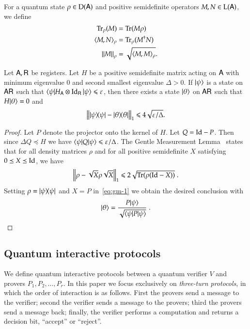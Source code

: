 For a quantum state $\rho \in \mathrm{D}({\mathsf{A}})$ and positive semidefinite operators $M,N \in \mathrm{L}({\mathsf{A}})$, we define 
\begin{align}
	\operatorname{Tr}_\rho(M) &= \operatorname{Tr}(M \rho) \\
	\langle M, N \rangle_\rho &= \operatorname{Tr}_\rho (M^\dagger N) \\
	\left\lVert M \right\rVert_\rho & = \sqrt{ \langle M, M \rangle_\rho}.
\end{align}

\begin{lemma}
\label{lem:closeness_to_groundspace}
	Let ${\mathsf{A}}, {\mathsf{R}}$ be registers. Let $H$ be a positive semidefinite matrix acting on ${\mathsf{A}}$ with minimum eigenvalue $0$ and second smallest eigenvalue $\Delta > 0$. If $|\psi\rangle$ is a state on ${\mathsf{A}} {\mathsf{R}}$ such that $\langle\psi| H_{{\mathsf{A}}} \otimes \mathop{\mathrm{Id}}\!\mathinner{}_{{\mathsf{R}}} |\psi\rangle \leqslant \varepsilon$, then there exists a state $|\theta\rangle$ on ${\mathsf{A}} {\mathsf{R}}$ such that $H |\theta\rangle = 0$ and
	\[
		\left \| |\psi\rangle\! \langle \psi| - |\theta\rangle\! \langle \theta| \right \|_1 \leqslant 4\sqrt{\varepsilon/\Delta}.
	\]
\end{lemma}
\begin{proof}
	Let $P$ denote the projector onto the kernel of $H$. Let $Q = \mathop{\mathrm{Id}}\!\mathinner{} - P$. Then since $\Delta Q \preceq H$ we have $\langle\psi| Q |\psi\rangle \leqslant \varepsilon/\Delta$. The Gentle Measurement Lemma~\cite{ogawa2002new} states that for all density matrices $\rho$ and for all positive semidefinite $X$ satisfying $0 \preceq X \preceq \mathop{\mathrm{Id}}\!\mathinner{}$, we have
	\begin{equation}\label{eq:gm-1}
		\left \| \rho - \sqrt{X}\rho \sqrt{X}  \right \|_1 \leq 2 \sqrt{ \Tr(\rho (\Id - X))}\;.
	\end{equation}
	Setting $\rho = |\psi\rangle\! \langle \psi|$ and $X = P$ in~\eqref{eq:gm-1} we obtain the desired conclusion with
	\[
		|\theta\rangle = \frac{ P |\psi\rangle}{\sqrt{ \langle\psi| P |\psi\rangle}}\;.
	\]
\end{proof}

\subsection{Quantum interactive protocols} 

We define quantum interactive protocols between a quantum verifier $V$ and provers $P_1,P_2,\ldots,P_r$. In this paper we focus exclusively on \emph{three-turn protocols}, in which the order of interaction is as follows. First the provers send a message to the verifier; second the verifier sends a message to the provers; third the provers send a message back; finally, the verifier performs a computation and returns a decision bit,  ``accept'' or ``reject''. 

